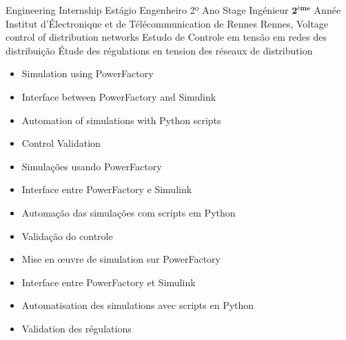 \cventry{\jul\ 2017 \newline \aug\ 2017 \newline}
{
  \ml
  {Engineering Internship}
  {Estágio Engenheiro 2º Ano}
  {Stage Ingénieur $ \mathbf{2^{ème}} $ Année}}
{\newline Institut d'Électronique et de Télécommunication de Rennes}
{\newline Rennes, }
{\newline
  \ml
  {Voltage control of distribution networks}
  {Estudo de Controle em tensão em redes des distribuição}
  {Étude des régulations en tension des réseaux de distribution}}
{\ml
  {
    \begin{itemize}
    \item Simulation using PowerFactory
    \item Interface between PowerFactory and Simulink
    \item Automation of simulations with Python scripts
    \item Control Validation
    \end{itemize}
  }
  {
    \begin{itemize}
    \item Simulações usando PowerFactory
    \item Interface entre PowerFactory e Simulink
    \item Automação das simulações com scripts em Python
    \item Validação do controle
    \end{itemize}
  }
  {
    \begin{itemize}
    \item Mise en \oe uvre de simulation sur PowerFactory
    \item Interface entre PowerFactory et Simulink
    \item Automatisation des simulations avec scripts en Python
    \item Validation des régulations
    \end{itemize}
  }
}

